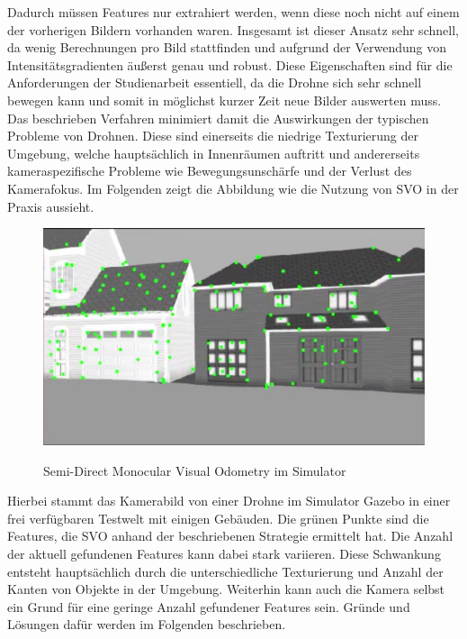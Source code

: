Dadurch müssen Features nur extrahiert werden, wenn diese noch nicht auf einem der vorherigen Bildern vorhanden waren. \newline
Insgesamt ist dieser Ansatz sehr schnell, da wenig Berechnungen pro Bild stattfinden und aufgrund der Verwendung von Intensitätsgradienten äußerst genau und robust. \newline
Diese Eigenschaften sind für die Anforderungen der Studienarbeit essentiell, da die Drohne sich sehr schnell bewegen kann und somit in möglichst kurzer Zeit neue Bilder auswerten muss. Das beschrieben Verfahren minimiert damit die Auswirkungen der typischen Probleme von Drohnen. Diese sind einerseits die niedrige Texturierung der Umgebung, welche hauptsächlich in Innenräumen auftritt und andererseits kameraspezifische Probleme wie Bewegungsunschärfe und der Verlust des Kamerafokus. \newline
Im Folgenden zeigt die Abbildung wie die Nutzung von SVO in der Praxis aussieht.
\begin{figure}[ht]
	\centering
	\includegraphics[scale=0.7]{Bilder/SVO.jpg}
	\label{fig:svo}
	\caption{Semi-Direct Monocular Visual Odometry im Simulator}
\end{figure}

Hierbei stammt das Kamerabild von einer Drohne im Simulator Gazebo in einer frei verfügbaren Testwelt mit einigen Gebäuden. Die grünen Punkte sind die Features, die SVO anhand der beschriebenen Strategie ermittelt hat. \newline
Die Anzahl der aktuell gefundenen Features kann dabei stark variieren. Diese Schwankung entsteht hauptsächlich durch die unterschiedliche Texturierung und Anzahl der Kanten von Objekte in der Umgebung. \newline
Weiterhin kann auch die Kamera selbst ein Grund für eine geringe Anzahl gefundener Features sein. Gründe und Lösungen dafür werden im Folgenden beschrieben.

